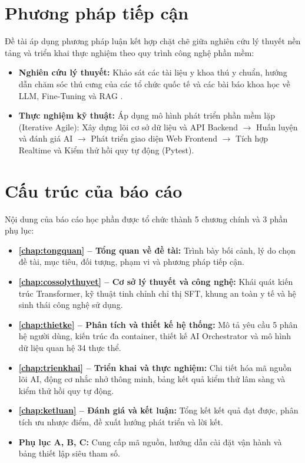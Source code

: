 \section{Phương pháp tiếp cận}
\label{sec:phuongphap}

Đề tài áp dụng phương pháp luận kết hợp chặt chẽ giữa nghiên cứu lý thuyết nền tảng và triển khai thực nghiệm theo quy trình công nghệ phần mềm:
\begin{itemize}[leftmargin=1.5cm]
    \item \textbf{Nghiên cứu lý thuyết:} Khảo sát các tài liệu y khoa thú y chuẩn, hướng dẫn chăm sóc thú cưng của các tổ chức quốc tế và các bài báo khoa học về LLM, Fine-Tuning và RAG \cite{goodfellow2016deeplearning,vaswani2017attention,achiam2023gpt4}.
    \item \textbf{Thực nghiệm kỹ thuật:} Áp dụng mô hình phát triển phần mềm lặp (Iterative Agile): Xây dựng lõi cơ sở dữ liệu và API Backend $\rightarrow$ Huấn luyện và đánh giá AI $\rightarrow$ Phát triển giao diện Web Frontend $\rightarrow$ Tích hợp Realtime và Kiểm thử hồi quy tự động (Pytest).
\end{itemize}

\section{Cấu trúc của báo cáo}
\label{sec:cautruc}

Nội dung của báo cáo học phần được tổ chức thành 5 chương chính và 3 phần phụ lục:
\begin{itemize}[leftmargin=1.5cm]
    \item \textbf{\cref{chap:tongquan} -- Tổng quan về đề tài:} Trình bày bối cảnh, lý do chọn đề tài, mục tiêu, đối tượng, phạm vi và phương pháp tiếp cận.
    \item \textbf{\cref{chap:cossolythuyet} -- Cơ sở lý thuyết và công nghệ:} Khái quát kiến trúc Transformer, kỹ thuật tinh chỉnh chỉ thị SFT, khung an toàn y tế và hệ sinh thái công nghệ sử dụng.
    \item \textbf{\cref{chap:thietke} -- Phân tích và thiết kế hệ thống:} Mô tả yêu cầu 5 phân hệ người dùng, kiến trúc đa container, thiết kế AI Orchestrator và mô hình dữ liệu quan hệ 34 thực thể.
    \item \textbf{\cref{chap:trienkhai} -- Triển khai và thực nghiệm:} Chi tiết hóa mã nguồn lõi AI, động cơ nhắc nhở thông minh, bảng kết quả kiểm thử lâm sàng và kiểm thử hồi quy tự động.
    \item \textbf{\cref{chap:ketluan} -- Đánh giá và kết luận:} Tổng kết kết quả đạt được, phân tích ưu nhược điểm, đề xuất hướng phát triển và lời kết.
    \item \textbf{Phụ lục A, B, C:} Cung cấp mã nguồn, hướng dẫn cài đặt vận hành và bảng thiết lập siêu tham số.
\end{itemize}
